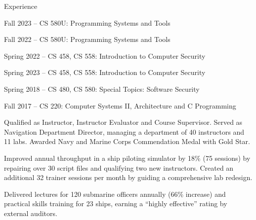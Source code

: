 \begin{rubric}{Experience}
\entry*[01/2022 \-- Present] 
\par \begin{list2}%
	\item {Fall 2023 \--- CS 580U: Programming Systems and Tools}
	\item {Fall 2022 \--- CS 580U: Programming Systems and Tools}
	\item {Spring 2022 \--- CS 458, CS 558: Introduction to Computer Security}
\end{list2}
\entry*[08/2017 \-- 05/2023] 
\par \begin{list2}%
	\item {Spring 2023 \--- CS 458, CS 558: Introduction to Computer Security}
	\item {Spring 2018 \--- CS 480, CS 580: Special Topics: Software Security}
	\item {Fall 2017 \--- CS 220: Computer Systems II, Architecture and C Programming}
\end{list2}
\entry*[09/2011 \-- 06/2014] 
\par \begin{list1}
	\item Qualified as Instructor, Instructor Evaluator and Course Supervisor. Served as Navigation Department Director, managing a department of 40 instructors and 11 labs. Awarded Navy and Marine Corps Commendation Medal with Gold Star.
	\item Improved annual throughput in a ship piloting simulator by 18\% (75 sessions) by repairing over 30 script files and qualifying two new instructors. Created an additional 32 trainer sessions per month by guiding a comprehensive lab redesign.
	\item Delivered lectures for 120 submarine officers annually (66\% increase) and practical skills training for 23 ships, earning a ``highly effective'' rating by external auditors.
\end{list1}
\entry*[04/2010 \-- 04/2011] 
\begin{list2}

\end{list2}
\end{rubric}

